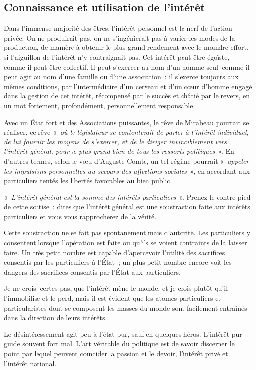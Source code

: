 \documentclass[french,twoside]{book} %
\newcommand{\astermono}{\medskip\centerline{\color{rubric}\large\selectfont{\syms ✻}}\medskip\par}%
\begin{document}
\subsection[{Connaissance et utilisation de l’intérêt}]{Connaissance et utilisation de l’intérêt}
\noindent Dans l’immense majorité des êtres, l’intérêt personnel est le nerf de l’action privée. On ne produirait pas, on ne s’ingénierait pas à varier les modes de la production, de manière à obtenir le plus grand rendement avec le moindre effort, si l’aiguillon de l’intérêt n’y contraignait pas. Cet intérêt peut être égoïste, comme il peut être collectif. Il peut s’exercer au nom d’un homme seul, comme il peut agir au nom d’une famille ou d’une association : il s’exerce toujours aux mêmes conditions, par l’intermédiaire d’un cerveau et d’un cœur d’homme engagé dans la gestion de cet intérêt, récompensé par le succès et châtié par le revers, en un mot fortement, profondément, personnellement responsable.\par

\astermono

\noindent Avec un État fort et des Associations puissantes, le rêve de Mirabeau pourrait se réaliser, ce rêve « \emph{où le législateur se contenterait de parler à l’intérêt individuel, de lui fournir les moyens de s’exercer, et de le diriger invinciblement vers l’intérêt général, pour le plus grand bien de tous les ressorts politiques} ». En d’autres termes, selon le vœu d’Auguste Comte, un tel régime pourrait « \emph{appeler les impulsions personnelles au secours des affections sociales} », en accordant aux particuliers tentés les libertés favorables au bien public.\par

\astermono

\noindent « \emph{L’intérêt général est la somme des intérêts particuliers} ». Prenez-le contre-pied de cette sottise : dites que l’intérêt général est une soustraction faite aux intérêts particuliers et vous vous rapprocherez de la vérité.\par
Cette soustraction ne se fait pas spontanément mais d’autorité. Les particuliers y consentent lorsque l’opération est faite ou qu’ils se voient contraints de la laisser faire. Un très petit nombre est capable d’apercevoir l’utilité des sacrifices consentis par les particuliers à l’État ; un plus petit nombre encore voit les dangers des sacrifices consentis par l’État aux particuliers.\par
Je ne crois, certes pas, que l’intérêt mène le monde, et je crois plutôt qu’il l’immobilise et le perd, mais il est évident que les atomes particuliers et particularistes dont se composent les masses du monde sont facilement entraînés dans la direction de leurs intérêts.\par
Le désintéressement agit peu à l’état pur, sauf en quelques héros. L’intérêt pur guide souvent fort mal. L’art véritable du politique est de savoir discerner le point par lequel peuvent coïncider la passion et le devoir, l’intérêt privé et l’intérêt national.\par
\end{document}
